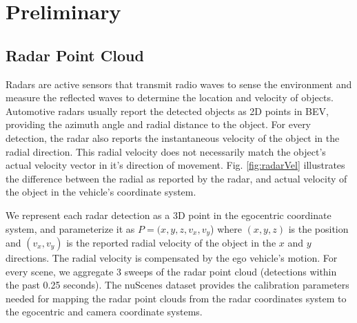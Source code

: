 \documentclass[10pt,twocolumn,letterpaper]{article}
\begin{document}
   
   \section{Preliminary}
   \subsection{Radar Point Cloud}
   Radars are active sensors that transmit radio waves to sense the environment 
   and measure the reflected waves to determine the location and velocity of 
   objects. Automotive radars usually report the detected objects as 2D points in 
   BEV, providing the azimuth angle and radial distance to the object. 
   For every detection, the radar also reports the instantaneous velocity of the 
   object in the radial direction. This radial velocity does not 
   necessarily match the object's actual velocity vector in it's direction of movement.
   Fig. \ref{fig:radarVel} illustrates the difference between the radial as reported
   by the radar, and actual velocity of the object in the vehicle's coordinate system.
   
   We represent each radar detection as a 3D point in the egocentric coordinate
   system, and parameterize it as $P=(x,y,z,v_x,v_y$) where $(x,y,z)$ is the
   position and $(v_x, v_y)$ is the reported radial velocity of the object in the 
   $x$ and $y$ directions. The radial velocity is compensated by the ego vehicle's 
   motion. For every scene, we aggregate 3 sweeps of the radar point cloud 
   (detections within the past 0.25 seconds). The nuScenes dataset provides the 
   calibration parameters needed for mapping the radar point clouds from the 
   radar coordinates system to the egocentric and camera coordinate systems.
   
\end{document}
